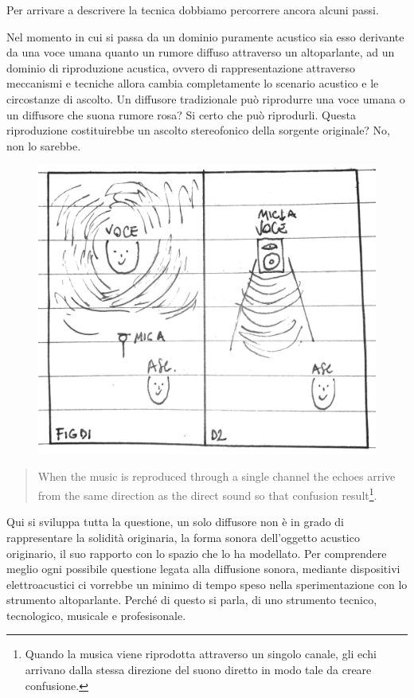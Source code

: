 Per arrivare a descrivere la tecnica dobbiamo percorrere ancora alcuni passi.

Nel momento in cui si passa da un dominio puramente acustico sia esso derivante
da una voce umana quanto un rumore diffuso attraverso un altoparlante, ad un
dominio di riproduzione acustica, ovvero di rappresentazione attraverso meccanismi
e tecniche allora cambia completamente lo scenario acustico e le circostanze di
ascolto. Un diffusore tradizionale può riprodurre una voce umana o un diffusore
che suona rumore rosa? Si certo che può riprodurli. Questa riproduzione
costituirebbe un ascolto stereofonico della sorgente originale? No, non lo sarebbe.

\begin{figure}[h]
\begin{center}
  \includegraphics[width=.98\linewidth]{CAPITOLI/1000/IMG/figd1d2.png}
\label{ee:figd1d2}
\end{center}
\end{figure}


\begin{quote}
When the music is reproduced through a single channel the echoes arrive from the same direction as the direct sound so that confusion result\footnote{Quando la musica viene riprodotta attraverso un singolo canale, gli echi arrivano dalla stessa direzione del suono diretto in modo tale da creare confusione.}.
\end{quote}

Qui si sviluppa tutta la questione, un solo diffusore non è in grado di rappresentare
la solidità originaria, la forma sonora dell'oggetto acustico originario, il suo
rapporto con lo spazio che lo ha modellato. Per comprendere meglio ogni possibile
questione legata alla diffusione sonora, mediante dispositivi elettroacustici ci
vorrebbe un minimo di tempo speso nella sperimentazione con lo strumento altoparlante.
Perché di questo si parla, di uno strumento tecnico, tecnologico, musicale e
profesisonale.

